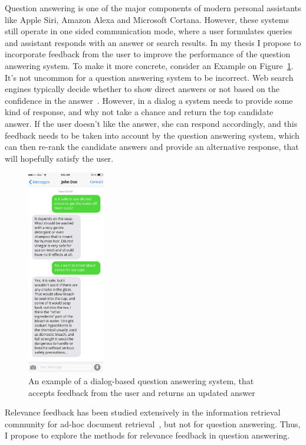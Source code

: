 Question answering is one of the major components of modern personal assistants like Apple Siri, Amazon Alexa and Microsoft Cortana.
However, these systems still operate in one sided communication mode, where a user formulates queries and assistant responds with an answer or search results.
In my thesis I propose to incorporate feedback from the user to improve the performance of the question answering system.
To make it more concrete, consider an Example on Figure~\ref{figure:users:proposal:example}.
It's not uncommon for a question answering system to be incorrect.
Web search engines typically decide whether to show direct answers or not based on the confidence in the answer~\cite{yang2015wikiqa}.
However, in a dialog a system needs to provide some kind of response, and why not take a chance and return the top candidate answer.
If the user doesn't like the answer, she can respond accordingly, and this feedback needs to be taken into account by the question answering system, which can then re-rank the candidate answers and provide an alternative response, that will hopefully satisfy the user.

\begin{figure}
\centering
\includegraphics[width=0.3\textwidth]{img/chatbot_example}
\caption{An example of a dialog-based question answering system, that accepts feedback from the user and returns an updated answer}
\label{figure:users:proposal:example}
\end{figure}

Relevance feedback has been studied extensively in the information retrieval community for ad-hoc document retrieval~\cite{salton1997improving,rocchio1971relevance,wang2008study}, but not for question answering.
Thus, I propose to explore the methods for relevance feedback in question answering.

